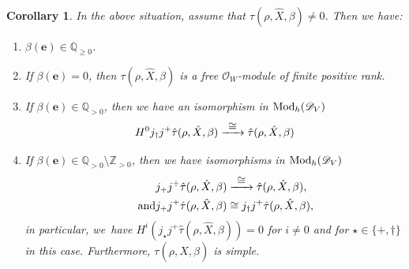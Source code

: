 \documentclass[JEP,XML,SOM,Unicode,published]{cedram}
\let\mathds\mathbb
\newcommand{\To}[1]{\mathchoice{\xrightarrow{\textstyle\kern4pt#1\kern3pt}}{\xrightarrow{\,#1\,}}{}{}}
\newcommand{\bme}{{\boldsymbol{e}}}
\newtheorem{cor}[thm]{Corollary}
\newcommand{\dQ}{{\mathds Q}}\let\Q\dQ
\newcommand{\dZ}{{\mathds Z}}\let\mbz\dZ\let\Z\dZ
\newcommand{\cD}{\mathscr{D}}
\newcommand{\cO}{\mathcal{O}}\let\O\cO
\begin{document}
\begin{cor}\label{cor:LocColocHatTau}
In the above situation, assume that $\tau(\rho,\hat{X},\beta)\neq 0$. Then we have:
\begin{enumerate}
\item $\beta(\bme)\in\dQ_{\geq 0}$.
\item
If $\beta(\bme) = 0$, then $\tau(\rho, \hat{X},\beta)$ is a free $\cO_W$\nobreakdash-mod\-ule of finite positive rank.

\item
If $\beta(\bme) \in \dQ_{>0}$, then
we have an isomorphism in $\textup{Mod}_h(\cD_V)$
\[
H^0j_\dag j^+ \hat{\tau}(\rho, \hat{X}, \beta) \To{\cong}\hat{\tau}(\rho, \hat{X}, \beta)
\]

\item
If $\beta(\bme) \in \dQ_{>0}\setminus \dZ_{>0}$, then
we have isomorphisms in $\textup{Mod}_h(\cD_V)$
\begin{align*}
j_+ j^+ \hat{\tau}(\rho, \hat{X}, \beta) &\To{\cong}\hat{\tau}(\rho, \hat{X}, \beta),
\\ \tag*{and}
j_+j^+\hat{\tau}(\rho, \hat{X}, \beta) &\cong j_\dag j^+ \hat{\tau}(\rho, \hat{X}, \beta),
\end{align*}
in particular, we~have $H^i(j_\star j^+\hat{\tau}(\rho, \hat{X}, \beta))=0$ for $i\neq 0$ and for $\star\in\{+,\dag\}$ in this case. Furthermore, $\tau(\rho,\hat{X},\beta)$ is simple.
\end{enumerate}
\end{cor}
\end{document}
